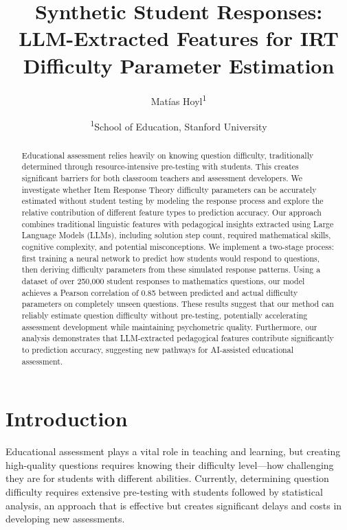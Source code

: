 \documentclass[
    a4paper, %
    10pt, %
    twoside, %
]{LTJournalArticle}
\title{Synthetic Student Responses: LLM-Extracted Features for IRT Difficulty Parameter Estimation}
\author{%
    Matías Hoyl\textsuperscript{1} 
}
\date{\footnotesize \textsuperscript{1}School of Education, Stanford University}
\begin{document}
\maketitle

\begin{abstract}
Educational assessment relies heavily on knowing question difficulty, traditionally determined through resource-intensive pre-testing with students. This creates significant barriers for both classroom teachers and assessment developers. We investigate whether Item Response Theory difficulty parameters can be accurately estimated without student testing by modeling the response process and explore the relative contribution of different feature types to prediction accuracy. Our approach combines traditional linguistic features with pedagogical insights extracted using Large Language Models (LLMs), including solution step count, required mathematical skills, cognitive complexity, and potential misconceptions. We implement a two-stage process: first training a neural network to predict how students would respond to questions, then deriving difficulty parameters from these simulated response patterns. Using a dataset of over 250,000 student responses to mathematics questions, our model achieves a Pearson correlation of 0.85 between predicted and actual difficulty parameters on completely unseen questions. These results suggest that our method can reliably estimate question difficulty without pre-testing, potentially accelerating assessment development while maintaining psychometric quality. Furthermore, our analysis demonstrates that LLM-extracted pedagogical features contribute significantly to prediction accuracy, suggesting new pathways for AI-assisted educational assessment.
\end{abstract}

\section{Introduction}

Educational assessment plays a vital role in teaching and learning, but creating high-quality questions requires knowing their difficulty level—how challenging they are for students with different abilities. Currently, determining question difficulty requires extensive pre-testing with students followed by statistical analysis, an approach that is effective but creates significant delays and costs in developing new assessments.
\end{document}
